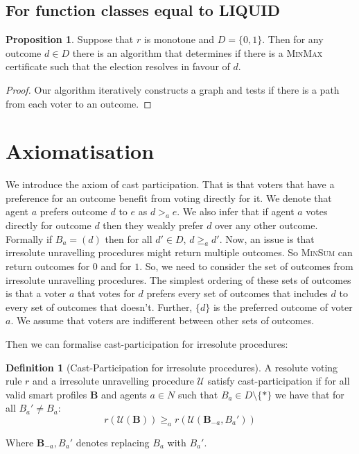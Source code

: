\documentclass[11pt,a4paper, titlepage]{article}
\theoremstyle{definition}
\newtheorem{definition}[theorem]{Definition}
\newtheorem{proposition}[theorem]{Proposition}
\begin{document}
\subsection{For function classes equal to LIQUID}

\begin{proposition}
    Suppose that $r$ is monotone and $D = \{0, 1\}$. Then for any outcome $d \in D$ there is an algorithm that determines if there is a \textsc{MinMax} certificate such that the election resolves in favour of $d$.
\end{proposition}
\begin{proof}
    Our algorithm iteratively constructs a graph and tests if there is a path from each voter to an outcome.
\end{proof}

\newpage
\section{Axiomatisation}

We introduce the axiom of cast participation. That is that voters that have a preference for an outcome benefit from voting directly for it. We denote that agent $a$ prefers outcome $d$ to $e$ as $d >_a e$. We also infer that if agent $a$ votes directly for outcome $d$ then they weakly prefer $d$ over any other outcome. Formally if $B_a = (d)$ then for all $d' \in D$, $d \geq_a d'$.
Now, an issue is that irresolute unravelling procedures might return multiple outcomes. So \textsc{MinSum} can return outcomes for $0$ and for $1$.
So, we need to consider the set of outcomes from irresolute unravelling procedures. The simplest ordering of these sets of outcomes is that a voter $a$ that votes for $d$ prefers every set of outcomes that includes $d$ to every set of outcomes that doesn't. Further, $\{d\}$ is the preferred outcome of voter $a$. We assume that voters are indifferent between other sets of outcomes. 

Then we can formalise cast-participation for irresolute procedures:

\begin{definition}[Cast-Participation for irresolute procedures]
    A resolute voting rule $r$ and a irresolute unravelling procedure $\mathcal{U}$ satisfy cast-participation if for all valid smart profiles $\mathbf{B}$ and agents $a \in N$ such that $B_a \in D \setminus \{*\}$ we have that for all $B_a' \neq B_a$:
    \[
        r(\mathcal{U}(\mathbf{B})) \geq_a r(\mathcal{U}(\mathbf{B}_{-a}, B_a'))
    \]

    Where $\mathbf{B}_{-a}, B_a'$ denotes replacing $B_a$ with $B_a'$. 
\end{definition}
\end{document}
